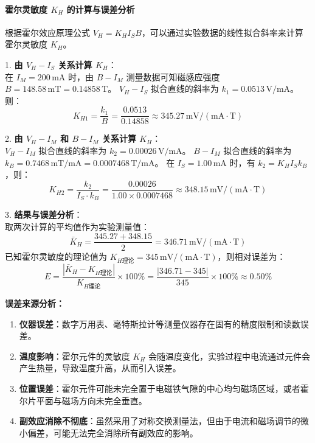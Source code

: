 \documentclass[11pt]{article}
\begin{document}
\paragraph{霍尔灵敏度 $K_H$ 的计算与误差分析}

根据霍尔效应原理公式 $V_H = K_H I_S B$，可以通过实验数据的线性拟合斜率来计算霍尔灵敏度 $K_H$。

1. \textbf{由 $V_H - I_S$ 关系计算 $K_H$}：\\
在 $I_M = 200\,\text{mA}$ 时，由 $B - I_M$ 测量数据可知磁感应强度 $B = 148.58\,\text{mT} = 0.14858\,\text{T}$。
$V_H - I_S$ 拟合直线的斜率为 $k_1 = 0.0513\,\text{V/mA}$。
则：
\begin{equation}
    K_{H1} = \frac{k_1}{B} = \frac{0.0513}{0.14858} \approx 345.27\,\text{mV}/(\text{mA}\cdot\text{T})
\end{equation}

2. \textbf{由 $V_H - I_M$ 和 $B - I_M$ 关系计算 $K_H$}：\\
$V_H - I_M$ 拟合直线的斜率为 $k_2 = 0.00026\,\text{V/mA}$。
$B - I_M$ 拟合直线的斜率为 $k_B = 0.7468\,\text{mT/mA} = 0.0007468\,\text{T/mA}$。
在 $I_S = 1.00\,\text{mA}$ 时，有 $k_2 = K_H I_S k_B$，则：
\begin{equation}
    K_{H2} = \frac{k_2}{I_S \cdot k_B} = \frac{0.00026}{1.00 \times 0.0007468} \approx 348.15\,\text{mV}/(\text{mA}\cdot\text{T})
\end{equation}

3. \textbf{结果与误差分析}：\\
取两次计算的平均值作为实验测量值：
\begin{equation}
    \bar{K}_H = \frac{345.27 + 348.15}{2} = 346.71\,\text{mV}/(\text{mA}\cdot\text{T})
\end{equation}
已知霍尔灵敏度的理论值为 $K_{H\text{理论}} = 345\,\text{mV}/(\text{mA}\cdot\text{T})$，则相对误差为：
\begin{equation}
    E = \frac{|\bar{K}_H - K_{H\text{理论}}|}{K_{H\text{理论}}} \times 100\% = \frac{|346.71 - 345|}{345} \times 100\% \approx 0.50\%
\end{equation}

\textbf{误差来源分析：}
\begin{enumerate}
    \item \textbf{仪器误差}：数字万用表、毫特斯拉计等测量仪器存在固有的精度限制和读数误差。
    \item \textbf{温度影响}：霍尔元件的灵敏度 $K_H$ 会随温度变化，实验过程中电流通过元件会产生热量，导致温度升高，从而引入误差。
    \item \textbf{位置误差}：霍尔元件可能未完全置于电磁铁气隙的中心均匀磁场区域，或者霍尔片平面与磁场方向未完全垂直。
    \item \textbf{副效应消除不彻底}：虽然采用了对称交换测量法，但由于电流和磁场调节的微小偏差，可能无法完全消除所有副效应的影响。
\end{enumerate}
\end{document}
